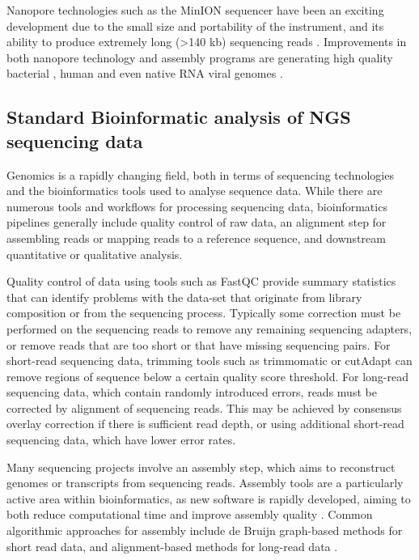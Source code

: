 Nanopore technologies such as the MinION sequencer have been an exciting development due to the small size and portability of the instrument, and its ability to produce extremely long (>140 kb) sequencing reads \citep{Jain2016-hk}. Improvements in both nanopore technology and assembly programs are generating high quality bacterial \citep{Quick2014-qr}, human \citep{Jain2018-xk} and even native RNA viral genomes \citep{Keller2018-sb}.\par

\subsection{Standard Bioinformatic analysis of NGS sequencing data}
Genomics is a rapidly changing field, both in terms of sequencing technologies and the bioinformatics tools used to analyse sequence data. While there are numerous tools and  workflows for processing sequencing data, bioinformatics pipelines generally include quality control of raw data, an alignment step for assembling reads or mapping reads to a reference sequence, and downstream quantitative or qualitative analysis.\par
Quality control of data using tools such as FastQC \citep{Andrews_2010} provide summary statistics that can identify problems with the data-set that originate from library composition or from the sequencing process. Typically some correction must be performed on the sequencing reads to remove any remaining sequencing adapters, or remove reads that are too short or that have missing sequencing pairs. For short-read sequencing data, trimming tools such as trimmomatic \citep{Bolger_Lohse_Usadel_2014} or cutAdapt \citep{Martin_2011} can remove regions of sequence below a certain quality score threshold. For long-read sequencing data, which contain randomly introduced errors, reads must be corrected by alignment of sequencing reads. This may be achieved by consensus overlay correction if there is sufficient read depth, or using additional short-read sequencing data, which have lower error rates.\par
Many sequencing projects involve an assembly step, which aims to reconstruct genomes or transcripts from sequencing reads. Assembly tools are a particularly active area within bioinformatics, as new software is rapidly developed, aiming to both reduce computational time and improve assembly quality \citep{Sohn_Nam_2018,Simpson_Pop_2015}. Common algorithmic approaches for assembly include de Bruijn graph-based methods for short read data, and alignment-based methods for long-read data \citep{Simpson_Pop_2015}.\par
